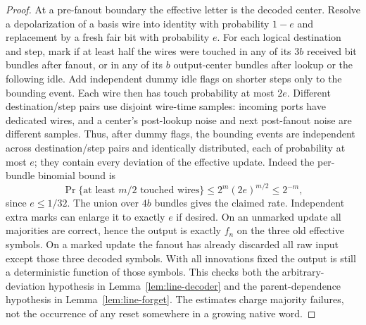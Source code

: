 \begin{proof}
At a pre-fanout boundary the effective letter is the decoded center.
Resolve a depolarization of a basis wire into identity with probability
$1-e$ and replacement by a fresh fair bit with probability $e$.
For each logical destination and step, mark if at least half the
wires were touched in any of its $3b$ received bit bundles after
fanout, or in any of its $b$ output-center bundles after lookup or
the following idle. Add independent dummy idle flags on shorter
steps only to the bounding event. Each wire then has touch probability
at most $2e$. Different destination/step pairs use disjoint wire-time
samples: incoming ports have dedicated wires, and a center's
post-lookup noise and next post-fanout noise are different samples.
Thus, after dummy flags, the bounding events are independent across
destination/step pairs and identically distributed, each of probability
at most $e$; they contain every deviation of the effective update.
Indeed the per-bundle binomial bound is
\[
 \Pr\{\text{at least }m/2\text{ touched wires}\}
 \le2^m(2e)^{m/2}\le2^{-m},
\]
since $e\le1/32$. The union over $4b$ bundles gives the claimed rate.
Independent extra marks can enlarge it to exactly $e$ if desired.
On an unmarked update all majorities are correct, hence the output
is exactly $f_n$ on the three old effective symbols. On a marked
update the fanout has already discarded all raw input except those
three decoded symbols. With all innovations fixed the output is
still a deterministic function of those symbols. This checks both
the arbitrary-deviation hypothesis in Lemma~\ref{lem:line-decoder}
and the parent-dependence hypothesis in Lemma~\ref{lem:line-forget}.
The estimates charge majority failures, not the occurrence of any
reset somewhere in a growing native word.
\end{proof}

